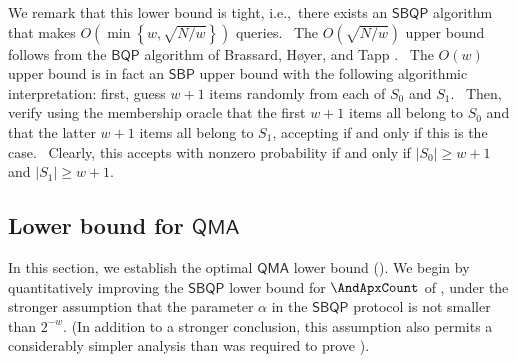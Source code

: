 We remark that this lower bound is tight, i.e.,\ there exists an $\mathsf{
SBQP}$ algorithm that makes $O\left( \min \left\{ w,\sqrt{N/w}\right\}
\right) $ queries. \ The $O(\sqrt{N/w})$ upper bound follows from the $
\mathsf{BQP}$ algorithm of Brassard, H{\o }yer, and Tapp \cite{bht:count}. \
The $O(w)$ upper bound is in fact an $\mathsf{SBP}$ upper bound with the
following algorithmic interpretation: first, guess $w+1$ items randomly from
each of $S_{0}$ and $S_{1}$. \ Then, verify using the membership oracle that
the first $w+1$ items all belong to $S_{0}$ and that the latter $w+1$ items
all belong to $S_{1}$, accepting if and only if this is the case. \ Clearly,
this accepts with nonzero probability if and only if $\left\vert
S_{0}\right\vert \geq w+1$ and $\left\vert S_{1}\right\vert \geq w+1$. 

%
\subsection{Lower bound for \texorpdfstring{$\mathsf{QMA}$}{QMA}}
\label{sec:QMA} 

In this section, we establish the optimal $\mathsf{QMA}$ lower bound 
(\Cref{thm:qmabound}).
We begin by quantitatively improving the $\mathsf{SBQP}$
lower bound for $\AndApxCount$ of ,
under the stronger assumption that the parameter $\alpha$ 
in the $\mathsf{SBQP}$ protocol is not smaller than $2^{-w}$.
(In addition to a stronger
conclusion, this assumption also permits a considerably simpler
analysis than was required to prove ).

